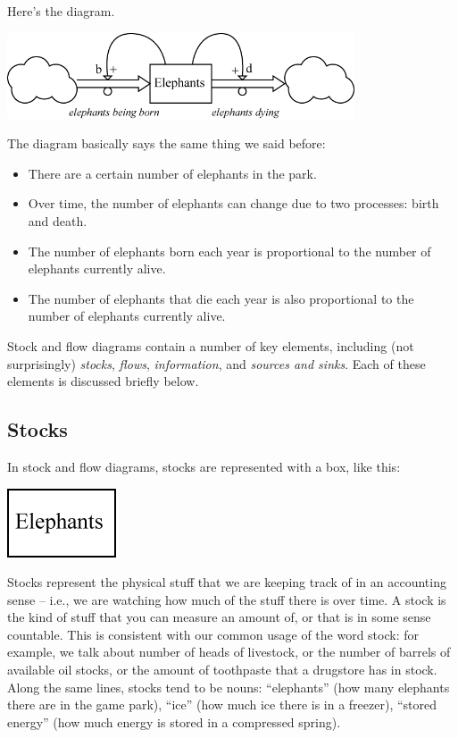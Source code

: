 Here's the diagram.

\beforefig
\centerline{\includegraphics[height=1in]{figs/ElephantStockAndFlow1}}
\afterfig

The diagram basically says the same thing we said before:

\begin{itemize}
\item There are a certain number of elephants in the park.
\item Over time, the number of elephants can change due to two processes: birth and death.
\item The number of elephants born each year is proportional to the number of elephants currently alive.
\item The number of elephants that die each year is also proportional to the number of elephants currently alive.
\end{itemize}

Stock and flow diagrams contain a number of key elements, including (not surprisingly) {\it stocks}, {\it flows}, {\it information}, and {\it sources and sinks}.  Each of these elements is discussed briefly below.


\subsection{Stocks}

In stock and flow diagrams, stocks are represented with a box, like this:

\beforefig
\centerline{\includegraphics[height=.5in]{figs/Stock}}
\afterfig

Stocks represent the physical stuff that we are keeping track of in an accounting sense -- i.e., we are watching how much of the stuff there is over time. A stock is the kind of stuff that you can measure an amount of, or that is in some sense countable.  This is consistent with our common usage of the word stock:  for example, we talk about number of heads of livestock, or the number of barrels of available oil stocks, or the amount of toothpaste that a drugstore has in stock.  Along the same lines, stocks tend to be nouns:  ``elephants'' (how many elephants there are in the game park), ``ice'' (how much ice there is in a freezer), ``stored energy'' (how much energy is stored in a compressed spring).  


